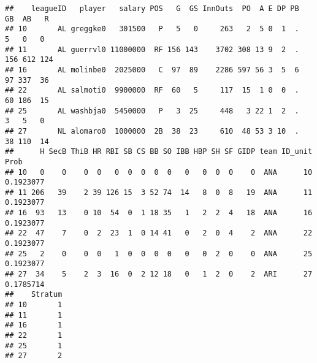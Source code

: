 \documentclass[
]{article}
\newenvironment{Shaded}{\begin{snugshade}}{\end{snugshade}}
\newcommand{\AttributeTok}[1]{\textcolor[rgb]{0.13,0.29,0.53}{#1}}
\newcommand{\CommentTok}[1]{\textcolor[rgb]{0.56,0.35,0.01}{\textit{#1}}}
\newcommand{\ConstantTok}[1]{\textcolor[rgb]{0.56,0.35,0.01}{#1}}
\newcommand{\DecValTok}[1]{\textcolor[rgb]{0.00,0.00,0.81}{#1}}
\newcommand{\FloatTok}[1]{\textcolor[rgb]{0.00,0.00,0.81}{#1}}
\newcommand{\FunctionTok}[1]{\textcolor[rgb]{0.13,0.29,0.53}{\textbf{#1}}}
\newcommand{\NormalTok}[1]{#1}
\newcommand{\OtherTok}[1]{\textcolor[rgb]{0.56,0.35,0.01}{#1}}
\newcommand{\SpecialCharTok}[1]{\textcolor[rgb]{0.81,0.36,0.00}{\textbf{#1}}}
\newcommand{\StringTok}[1]{\textcolor[rgb]{0.31,0.60,0.02}{#1}}
\begin{document}
\begin{verbatim}
##    leagueID   player   salary POS   G  GS InnOuts  PO  A E DP PB  GB  AB   R
## 10       AL greggke0   301500   P   5   0     263   2  5 0  1  .   5   0   0
## 11       AL guerrvl0 11000000  RF 156 143    3702 308 13 9  2  . 156 612 124
## 16       AL molinbe0  2025000   C  97  89    2286 597 56 3  5  6  97 337  36
## 22       AL salmoti0  9900000  RF  60   5     117  15  1 0  0  .  60 186  15
## 25       AL washbja0  5450000   P   3  25     448   3 22 1  2  .   3   5   0
## 27       NL alomaro0  1000000  2B  38  23     610  48 53 3 10  .  38 110  14
##      H SecB ThiB HR RBI SB CS BB SO IBB HBP SH SF GIDP team ID_unit      Prob
## 10   0    0    0  0   0  0  0  0  0   0   0  0  0    0  ANA      10 0.1923077
## 11 206   39    2 39 126 15  3 52 74  14   8  0  8   19  ANA      11 0.1923077
## 16  93   13    0 10  54  0  1 18 35   1   2  2  4   18  ANA      16 0.1923077
## 22  47    7    0  2  23  1  0 14 41   0   2  0  4    2  ANA      22 0.1923077
## 25   2    0    0  0   1  0  0  0  0   0   0  2  0    0  ANA      25 0.1923077
## 27  34    5    2  3  16  0  2 12 18   0   1  2  0    2  ARI      27 0.1785714
##    Stratum
## 10       1
## 11       1
## 16       1
## 22       1
## 25       1
## 27       2
\end{verbatim}

\begin{Shaded}
\end{Shaded}
\end{document}
